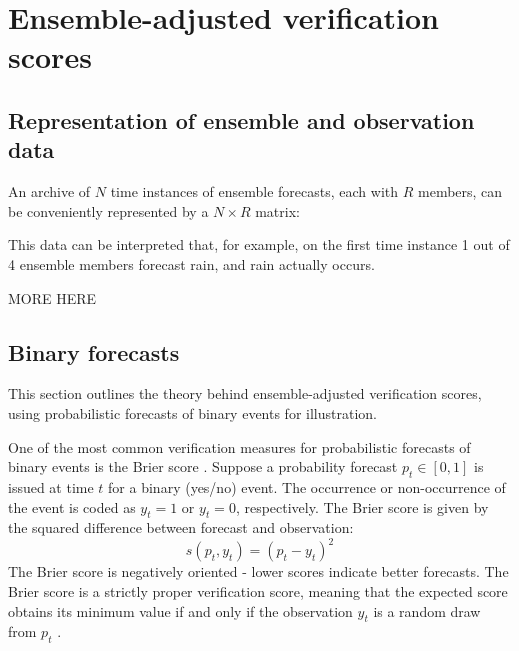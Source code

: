 \documentclass[article]{jss}
\begin{document}
\section{Ensemble-adjusted verification scores}

\subsection{Representation of ensemble and observation data}

An archive of $N$ time instances of ensemble forecasts, each with $R$ members, can be conveniently represented by a $N\times R$ matrix:

This data can be interpreted that, for example, on the first time instance 1 out of 4 ensemble members forecast rain, and rain actually occurs.


MORE HERE



\subsection{Binary forecasts}

This section outlines the theory behind ensemble-adjusted verification scores, using probabilistic forecasts of binary events for illustration.  

One of the most common verification measures for probabilistic forecasts of binary events is the Brier score \citep{brier1950verification}.
Suppose a probability forecast $p_t \in [0,1]$ is issued at time $t$ for a binary (yes/no) event.
The occurrence or non-occurrence of the event is coded as $y_t=1$ or $y_t=0$, respectively. 
The Brier score is given by the squared difference between forecast and observation:
%
\begin{equation}
s(p_t, y_t) = (p_t - y_t)^2
\end{equation}
%
The Brier score is negatively oriented - lower scores indicate better forecasts.
The Brier score is a strictly proper verification score, meaning that the expected score obtains its minimum value if and only if the observation $y_t$ is a random draw from $p_t$ \citep{gneiting2007strictly}.
\end{document}
